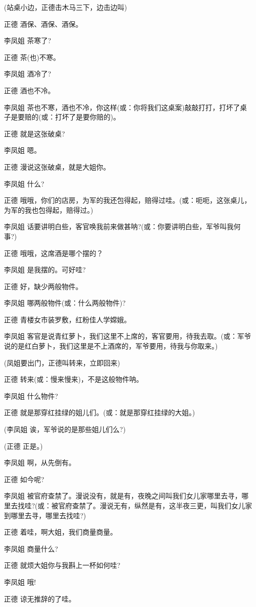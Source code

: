 (站桌小边，正德击木马三下，边击边叫)

正德 酒保、酒保、酒保。

李凤姐 茶寒了?

正德 茶(也)不寒。

李凤姐 酒冷了?

正德 酒也不冷。

李凤姐
茶也不寒，酒也不冷，你这样(或：你将我们这桌案)敲敲打打，打坏了桌子是要赔的(或：打坏了是要你赔的)。

正德 就是这张破桌?

李凤姐 嗯。

正德 漫说这张破桌，就是大姐你。

李凤姐 什么?

正德
哦哦，你们的店房，为军的我还包得起，赔得过哇。(或：呃呃，这张桌儿，为军的我也包得起，赔得过。)

李凤姐
话要讲明白些，客官唤我前来做甚呐?(或：你要讲明白些，军爷叫我何事?)

正德 哦哦，这席酒是哪个摆的？

李凤姐 是我摆的。可好哇?

正德 好，缺少两般物件。

李凤姐 哪两般物件(或：什么两般物件)?

正德 青楼女市装罗敷，红粉佳人学嫦娥。

李凤姐
客官是说青红萝卜，我们这里不上席的，客官要用，待我去取。(或：军爷说的是红白萝卜，我们这里是不上酒席的，军爷要用，待我与你取来。)

(凤姐要出门，正德叫转来，立即回来)

正德 转来(或：慢来慢来)，不是这般物件呐。

李凤姐 什么物件?

正德 就是那穿红挂绿的姐儿们。(或：就是那穿红挂绿的大姐。)

(李凤姐 诶，军爷说的是那些姐儿们么?)

(正德 正是。)

李凤姐 啊，从先倒有。

正德 如今呢?

李凤姐
被官府查禁了。漫说没有，就是有，夜晚之间叫我们女儿家哪里去寻，哪里去找哇?(或：被官府查禁了。漫说无有，纵然是有，这半夜三更，叫我们女儿家到哪里去寻，哪里去找哇?)

正德 着哇，啊大姐，我们商量商量。

李凤姐 商量什么?

正德 就烦大姐你与我斟上一杯如何哇?

李凤姐 哦!

正德 谅无推辞的了哇。

